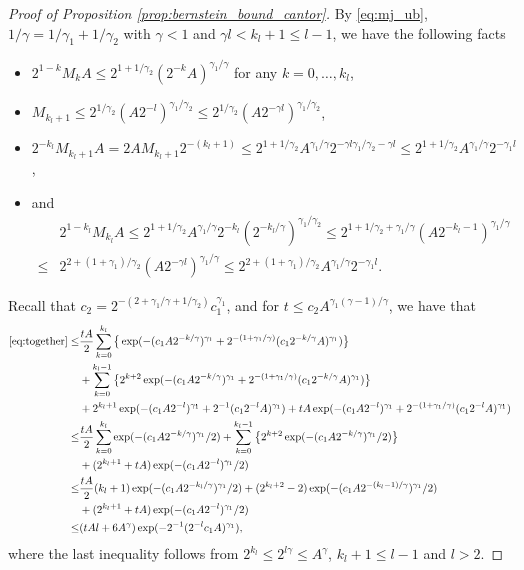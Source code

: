 \documentclass[11pt]{article}
\theoremstyle{plain}
\theoremstyle{definition}
\begin{document}
\begin{proof}[Proof of Proposition \ref{prop:bernstein_bound_cantor}]
    By \eqref{eq:mj_ub}, $1/\gamma = 1/\gamma_1 + 1/\gamma_2$ with $\gamma < 1$ and $\gamma l < k_l + 1 \leq l-1$, we have the following facts
    \begin{itemize}
        \item $2^{1-k}M_{k}A \leq 2^{1+1/\gamma_2}(2^{-k}A)^{\gamma_1/\gamma}$ for any $k = 0, \dots, k_l$,
        \item $M_{k_l+1} \leq 2^{1/\gamma_2}(A2^{-l})^{\gamma_1/\gamma_2} \leq 2^{1/\gamma_2}(A2^{-\gamma l})^{\gamma_1/\gamma_2}$,
        \item $2^{-k_l}M_{k_l+1}A = 2AM_{k_l+1}2^{-(k_l+1)} \leq 2^{1+1/\gamma_2}A^{\gamma_1/\gamma}2^{-\gamma l\gamma_1/\gamma_2-\gamma l} \leq 2^{1+1/\gamma_2}A^{\gamma_1/\gamma}2^{-\gamma_1l}$,
        \item and \begin{align*}
            & 2^{1-k_l}M_{k_l}A \leq 2^{1+1/\gamma_2}A^{\gamma_1/\gamma}2^{-k_l}(2^{-k_l/\gamma})^{\gamma_1/\gamma_2} \leq 2^{1+1/\gamma_2+\gamma_1/\gamma}(A2^{-k_l-1})^{\gamma_1/\gamma} \\
            \leq & 2^{2+(1+\gamma_1)/\gamma_2}(A2^{-\gamma l})^{\gamma_1/\gamma} \leq 2^{2+(1+\gamma_1)/\gamma_2}A^{\gamma_1/\gamma}2^{-\gamma_1l}.
        \end{align*}
    \end{itemize}
    Recall that $c_2 = 2^{-(2+\gamma_1/\gamma+1/\gamma_2)}c_1^{\gamma_1}$, and for $t \leq c_2A^{\gamma_1(\gamma-1)/\gamma}$, we have that
    \begin{align*}
        \eqref{eq:together}
        \leq& \frac{tA}{2}\sum_{k = 0}^{k_l}\big\{\exp(-(c_1A2^{-k/\gamma})^{\gamma_1} + 2^{-(1+\gamma_1/\gamma)}(c_12^{-k/\gamma}A)^{\gamma_1})\big\}\\
        &+ \sum_{k = 0}^{k_l-1}\big\{2^{k+2}\exp(-(c_1A2^{-k/\gamma})^{\gamma_1} + 2^{-(1+\gamma_1/\gamma)}(c_12^{-k/\gamma}A)^{\gamma_1})\big\}\\
        &+ 2^{k_l+1}\exp(-(c_1A2^{-l})^{\gamma_1}+2^{-1}(c_12^{-l}A)^{\gamma_1}) + tA\exp(-(c_1A2^{-l})^{\gamma_1}+2^{-(1+\gamma_1/\gamma)}(c_12^{-l}A)^{\gamma_1})\\
        \leq& \frac{tA}{2}\sum_{k = 0}^{k_l}\exp(-(c_1A2^{-k/\gamma})^{\gamma_1}/2) + \sum_{k = 0}^{k_l-1}\big\{2^{k+2}\exp(-(c_1A2^{-k/\gamma})^{\gamma_1}/2)\big\}\\
        &+ (2^{k_l+1} + tA)\exp(-(c_1A2^{-l})^{\gamma_1}/2)\\
        \leq& \frac{tA}{2}(k_l+1)\exp(-(c_1A2^{-k_l/\gamma})^{\gamma_1}/2) + (2^{k_l+2}-2)\exp(-(c_1A2^{-(k_l-1)/\gamma})^{\gamma_1}/2)\\
        &+ (2^{k_l+1} + tA)\exp(-(c_1A2^{-l})^{\gamma_1}/2)\\
        \leq& (tAl + 6A^{\gamma})\exp(-2^{-1}(2^{-l}c_1A)^{\gamma_1}),
    \end{align*}
    where the last inequality follows from $2^{k_l} \leq 2^{l\gamma} \leq A^{\gamma}$, $k_l+1 \leq l-1$ and $l > 2$.
    

\end{proof}
\end{document}
